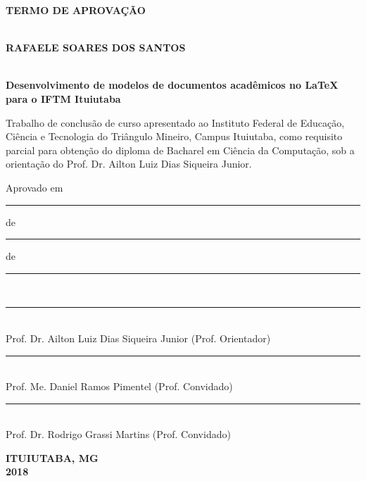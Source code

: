 \newpage
\thispagestyle{empty}

\begin{center}
\textbf{TERMO DE APROVAÇÃO\\}

\textbf{\\RAFAELE SOARES DOS SANTOS\\}

\textbf{\\Desenvolvimento de modelos de documentos acadêmicos no LaTeX para o IFTM Ituiutaba}
\end{center}

\vspace*{1.5 cm}

\hfill
\begin{minipage}{8cm}
Trabalho de conclusão de curso apresentado ao Instituto Federal de Educação, Ciência e Tecnologia do Triângulo Mineiro, Campus Ituiutaba, como requisito parcial para obtenção do diploma de Bacharel em Ciência da Computação, sob a orientação do Prof. Dr. Ailton Luiz Dias Siqueira Junior.\\
\end{minipage}

\vspace*{0.75 cm}

\begin{flushleft}
Aprovado em \rule{1cm}{.1mm} de \rule{3cm}{.1mm} de \rule{2cm}{.1mm}\\
\end{flushleft}

\vspace*{0.75 cm}

\begin{center}
\rule{12cm}{.1mm}\\
Prof. Dr. Ailton Luiz Dias Siqueira Junior (Prof. Orientador)\\

\vspace*{0.75 cm}

\rule{12cm}{.1mm}\\
Prof. Me. Daniel Ramos Pimentel (Prof. Convidado)\\

\vspace*{0.75 cm}

\rule{12cm}{.1mm}\\
Prof. Dr. Rodrigo Grassi Martins (Prof. Convidado)\\

\vspace*{2.5 cm}

\textbf{ITUIUTABA, MG\\2018}
\end{center}